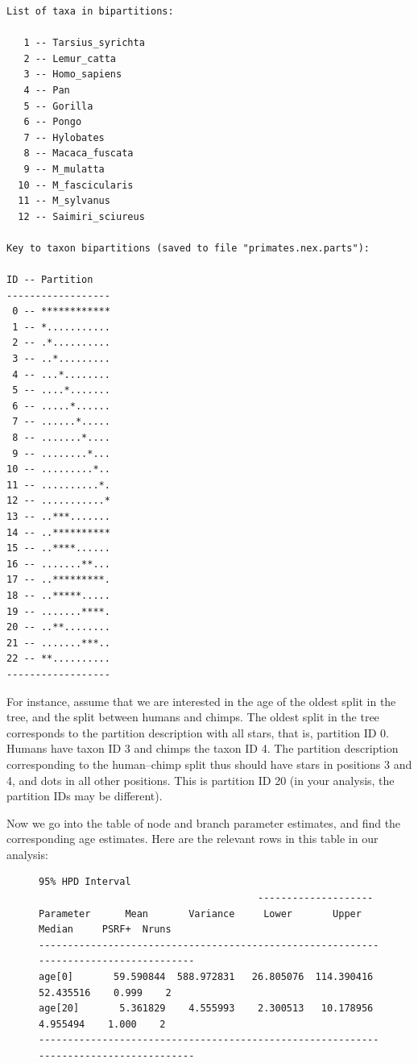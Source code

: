 \documentclass[12pt]{book}
\begin{document}
\begin{Verbatim}[xleftmargin=15mm,fontsize=\footnotesize]
List of taxa in bipartitions:

   1 -- Tarsius_syrichta
   2 -- Lemur_catta
   3 -- Homo_sapiens
   4 -- Pan
   5 -- Gorilla
   6 -- Pongo
   7 -- Hylobates
   8 -- Macaca_fuscata
   9 -- M_mulatta
  10 -- M_fascicularis
  11 -- M_sylvanus
  12 -- Saimiri_sciureus

Key to taxon bipartitions (saved to file "primates.nex.parts"):

ID -- Partition
------------------
 0 -- ************
 1 -- *...........
 2 -- .*..........
 3 -- ..*.........
 4 -- ...*........
 5 -- ....*.......
 6 -- .....*......
 7 -- ......*.....
 8 -- .......*....
 9 -- ........*...
10 -- .........*..
11 -- ..........*.
12 -- ...........*
13 -- ..***.......
14 -- ..**********
15 -- ..****......
16 -- .......**...
17 -- ..*********.
18 -- ..*****.....
19 -- .......****.
20 -- ..**........
21 -- .......***..
22 -- **..........
------------------
\end{Verbatim}

For instance, assume that we are interested in the age of the oldest split in the tree, and the
split between humans and chimps. The oldest split in the tree corresponds to the partition
description with all stars, that is, partition ID 0. Humans have taxon ID 3 and chimps the taxon ID
4. The partition description corresponding to the human--chimp split thus should have stars in
positions 3 and 4, and dots in all other positions. This is partition ID 20 (in your analysis, the
partition IDs may be different).

Now we go into the table of node and branch parameter estimates, and find the corresponding age
estimates. Here are the relevant rows in this table in our analysis:

\begin{figure}[H]
\centering
    \begin{BVerbatim}[fontsize=\scriptsize]
                                        95% HPD Interval
                                      --------------------
Parameter      Mean       Variance     Lower       Upper       Median     PSRF+  Nruns
--------------------------------------------------------------------------------------
age[0]       59.590844  588.972831   26.805076  114.390416   52.435516    0.999    2
age[20]       5.361829    4.555993    2.300513   10.178956    4.955494    1.000    2
--------------------------------------------------------------------------------------
\end{BVerbatim}
\end{figure}
\end{document}
